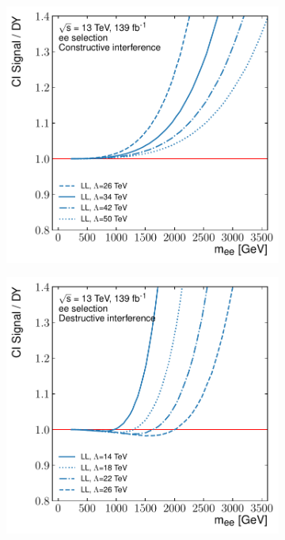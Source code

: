 \begin{figure}[]
    \centering
    \begin{subfigure}[b]{0.49\textwidth}
        \centering
        \includegraphics[width=\textwidth]{figures/analysis/datamc/sigmodel/fit-const-ee-backgroundModel.pdf}
    
        \label{fig:datamc:sigShape1}
    \end{subfigure}
    \begin{subfigure}[b]{0.49\textwidth}
        \centering
        \includegraphics[width=\textwidth]{figures/analysis/datamc/sigmodel/fit-dest-ee-backgroundModel.pdf}
    

\end{subfigure}
\end{figure}

